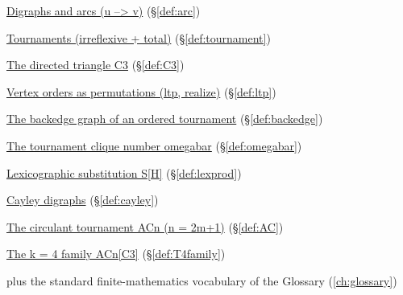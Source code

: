 \begin{closurepanel}
\item \hyperref[def:arc]{Digraphs and arcs (u --> v)} (\S\ref*{def:arc})
\item \hyperref[def:tournament]{Tournaments (irreflexive + total)} (\S\ref*{def:tournament})
\item \hyperref[def:C3]{The directed triangle C3} (\S\ref*{def:C3})
\item \hyperref[def:ltp]{Vertex orders as permutations (ltp, realize)} (\S\ref*{def:ltp})
\item \hyperref[def:backedge]{The backedge graph of an ordered tournament} (\S\ref*{def:backedge})
\item \hyperref[def:omegabar]{The tournament clique number omegabar} (\S\ref*{def:omegabar})
\item \hyperref[def:lexprod]{Lexicographic substitution S[H]} (\S\ref*{def:lexprod})
\item \hyperref[def:cayley]{Cayley digraphs} (\S\ref*{def:cayley})
\item \hyperref[def:AC]{The circulant tournament ACn (n = 2m+1)} (\S\ref*{def:AC})
\item \hyperref[def:T4family]{The k = 4 family ACn[C3]} (\S\ref*{def:T4family})
\item plus the standard finite-mathematics vocabulary of the Glossary (\cref{ch:glossary})
\end{closurepanel}
